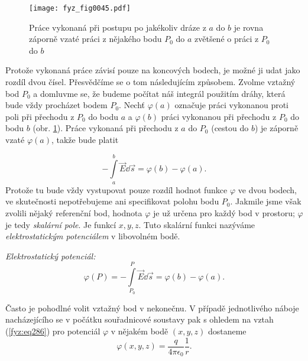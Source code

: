     \begin{figure}[ht!]  %
      \centering
      \texttt{[image: fyz\_fig0045.pdf]}
      \caption{Práce vykonaná při postupu po jakékoliv dráze z \(a\) do \(b\) je rovna záporně     
        vzaté práci z nějakého bodu \(P_0\) do \(a\) zvětšené o práci z \(P_0\) do \(b\)}
      \label{fyz:fig0045}
    \end{figure}
    Protože vykonaná práce závisí pouze na koncových bodech, je možné ji udat jako rozdíl dvou 
    čísel. Přesvědčíme se o tom následujícím způsobem. Zvolme vztažný bod \(P_0\) a domluvme se, že 
    budeme počítat náš integrál použitím dráhy, která bude vždy procházet bodem \(P_0\). Nechť 
    \(\varphi(a)\) označuje práci vykonanou proti poli při přechodu z \(P_0\) do bodu \(a\) a 
    \(\varphi(b)\) práci vykonanou při přechodu z \(P_0\) do bodu \(b\) (obr. 
    \ref{fyz:fig0045}). Práce vykonaná při přechodu z \(a\) do \(P_0\) (cestou do \(b\)) 
    je záporně vzaté \(\varphi(a)\), takže bude platit

    \begin{equation}\label{fyz:fey_eq_elstat21}
     - \int\limits_{a}^{b}\vec{E}\dd{\vec{s}} = \varphi(b) - \varphi(a). 
    \end{equation}
    Protože tu bude vždy vystupovat pouze rozdíl hodnot funkce \(\varphi\) ve dvou bodech, ve 
    skutečnosti nepotřebujeme ani specifikovat polohu bodu \(P_0\). Jakmile jsme však zvolili 
    nějaký referenční bod, hodnota \(\varphi\) je už určena pro každý bod v prostoru; \(\varphi\) 
    je tedy \emph{skalární pole}. Je funkcí \(x, y, z\). Tuto skalární funkci nazýváme 
    \emph{elektrostatickým potenciálem} v libovolném bodě.

    \emph{Elektrostatický potenciál:}
     \begin{equation}\label{fyz:fey_eq_elstat22}
       \varphi(P) = - \int\limits_{P_0}^{P}\vec{E}\dd{\vec{s}} = \varphi(b) - \varphi(a). 
     \end{equation} 
    
    Často je pohodlné volit vztažný	bod v nekonečnu. V případě jednotlivého	náboje nacházejícího se 
    v počátku souřadnicové soustavy pak s ohledem	na vztah (\ref{fyz:eq286}) pro 
    potenciál 
    \(\varphi\) v nějakém bodě \((x, y, z)\) dostaneme
    \begin{equation}\label{fyz:fey_eq_elstat23}
     \varphi(x, y, z) = \frac{q}{4\pi\epsilon_0}\frac{1}{r}. 
    \end{equation}

